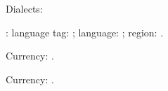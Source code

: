 \documentclass{article}
\begin{document}
Dialects:
\ForEachTrackedDialect\thisdialect
{
\par
\thisdialect:
language tag: \GetTrackedLanguageTag{\thisdialect};
language: \TrackedLanguageFromDialect{\thisdialect};
region: \TrackedIsoCodeFromLanguage{\TwoLetterIsoCountryCode}{\thisdialect}.
 }

Currency: \result.

Currency: \result.




\DTLparse\result{\$}\result
\show\result
\end{document}
